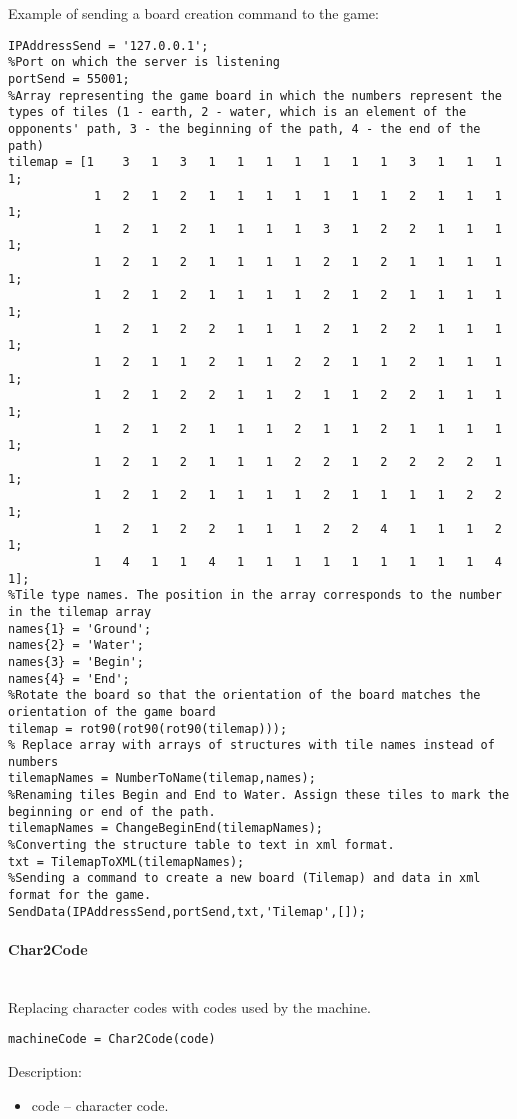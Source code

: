 Example of sending a board creation command to the game:
\begin{lstlisting}[style=Matlab-editor]
%Server address
IPAddressSend = '127.0.0.1';
%Port on which the server is listening
portSend = 55001;
%Array representing the game board in which the numbers represent the types of tiles (1 - earth, 2 - water, which is an element of the opponents' path, 3 - the beginning of the path, 4 - the end of the path)
tilemap = [1	3	1	3	1	1	1	1	1	1	1	3	1	1	1 1;
           	1	2	1	2	1	1	1	1	1	1	1	2	1	1	1 1;
           	1	2	1	2	1	1	1	1	3	1	2	2	1	1	1 1;
           	1	2	1	2	1	1	1	1	2	1	2	1	1	1	1 1;
           	1	2	1	2	1	1	1	1	2	1	2	1	1	1	1 1;
           	1	2	1	2	2	1	1	1	2	1	2	2	1	1	1 1;
           	1	2	1	1	2	1	1	2	2	1	1	2	1	1	1 1;
           	1	2	1	2	2	1	1	2	1	1	2	2	1	1	1 1;
           	1	2	1	2	1	1	1	2	1	1	2	1	1	1	1 1;
           	1	2	1	2	1	1	1	2	2	1	2	2	2	2	1 1;
           	1	2	1	2	1	1	1	1	2	1	1	1	1	2	2 1;
           	1	2	1	2	2	1	1	1	2	2	4	1	1	1	2 1;
           	1	4	1	1	4	1	1	1	1	1	1	1	1	1	4 1];
%Tile type names. The position in the array corresponds to the number in the tilemap array
names{1} = 'Ground';
names{2} = 'Water';
names{3} = 'Begin';
names{4} = 'End';
%Rotate the board so that the orientation of the board matches the orientation of the game board
tilemap = rot90(rot90(rot90(tilemap)));
% Replace array with arrays of structures with tile names instead of numbers
tilemapNames = NumberToName(tilemap,names);
%Renaming tiles Begin and End to Water. Assign these tiles to mark the beginning or end of the path.
tilemapNames = ChangeBeginEnd(tilemapNames);
%Converting the structure table to text in xml format.
txt = TilemapToXML(tilemapNames);
%Sending a command to create a new board (Tilemap) and data in xml format for the game.
SendData(IPAddressSend,portSend,txt,'Tilemap',[]);
\end{lstlisting}

\paragraph{Char2Code} \hspace{0pt} \\
Replacing character codes with codes used by the machine.
\begin{lstlisting}[style=Matlab-editor]
machineCode = Char2Code(code)
\end{lstlisting}

Description:
\begin{itemize}
\item code -- character code.
\end{itemize}

